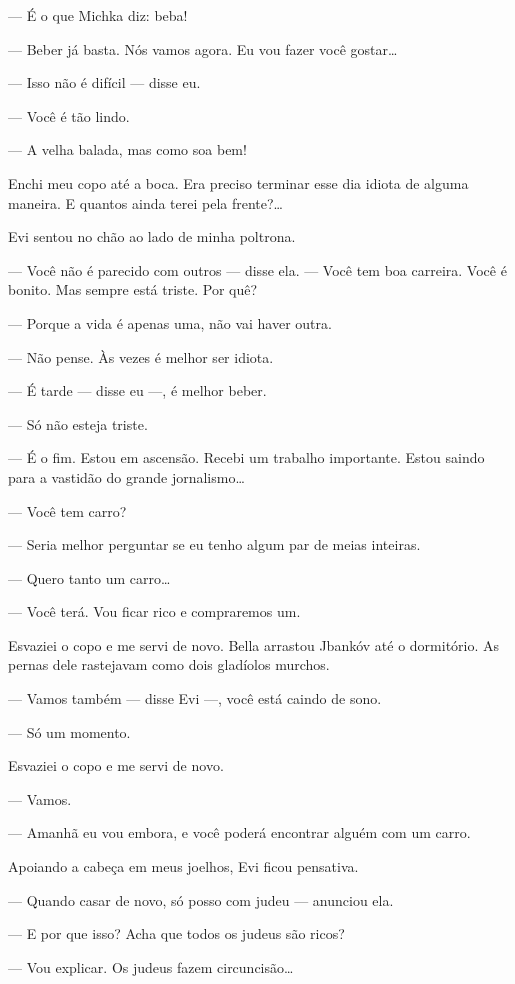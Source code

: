 --- É o que Michka diz: beba!

--- Beber já basta. Nós vamos agora. Eu vou fazer você gostar\ldots{}

--- Isso não é difícil --- disse eu.

--- Você é tão lindo.

--- A velha balada, mas como soa bem!

Enchi meu copo até a boca. Era preciso terminar esse dia idiota de
alguma maneira. E quantos ainda terei pela frente?\ldots{}

Evi sentou no chão ao lado de minha poltrona.

--- Você não é parecido com outros --- disse ela.
--- Você tem boa carreira. Você é bonito. Mas sempre está triste.
Por quê?

--- Porque a vida é apenas uma, não vai haver outra.

--- Não pense. Às vezes é melhor ser idiota.

--- É tarde --- disse eu ---, é melhor beber.

--- Só não esteja triste.

--- É o fim. Estou em ascensão. Recebi um trabalho importante.
Estou saindo para a vastidão do grande jornalismo\ldots{}

--- Você tem carro?

--- Seria melhor perguntar se eu tenho algum par de meias
inteiras.

--- Quero tanto um carro\ldots{}

--- Você terá. Vou ficar rico e compraremos um.

Esvaziei o copo e me servi de novo. Bella arrastou Jbankóv até o
dormitório. As pernas dele rastejavam como dois gladíolos murchos.

--- Vamos também --- disse Evi ---, você está
caindo de sono.

--- Só um momento.

Esvaziei o copo e me servi de novo.

--- Vamos.

--- Amanhã eu vou embora, e você poderá encontrar alguém com um
carro.

Apoiando a cabeça em meus joelhos, Evi ficou pensativa.

--- Quando casar de novo, só posso com judeu --- anunciou
ela.

--- E por que isso? Acha que todos os judeus são ricos?

--- Vou explicar. Os judeus fazem circuncisão\ldots{}

